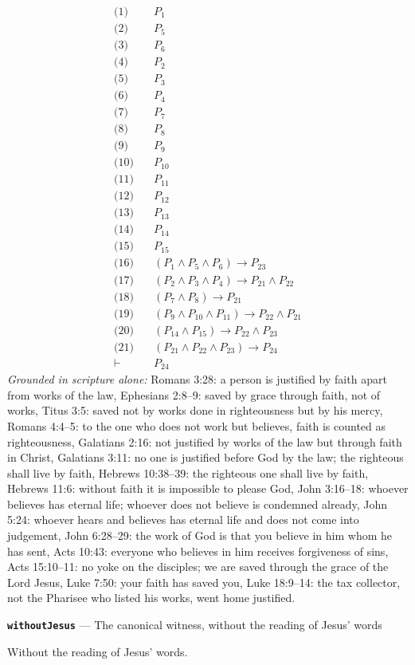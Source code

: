 \documentclass[11pt]{article}
\begin{document}
\begin{align*}
  \text{(1)} \quad & P_{1} \\
  \text{(2)} \quad & P_{5} \\
  \text{(3)} \quad & P_{6} \\
  \text{(4)} \quad & P_{2} \\
  \text{(5)} \quad & P_{3} \\
  \text{(6)} \quad & P_{4} \\
  \text{(7)} \quad & P_{7} \\
  \text{(8)} \quad & P_{8} \\
  \text{(9)} \quad & P_{9} \\
  \text{(10)} \quad & P_{10} \\
  \text{(11)} \quad & P_{11} \\
  \text{(12)} \quad & P_{12} \\
  \text{(13)} \quad & P_{13} \\
  \text{(14)} \quad & P_{14} \\
  \text{(15)} \quad & P_{15} \\
  \text{(16)} \quad & (P_{1} \land P_{5} \land P_{6}) \rightarrow P_{23} \\
  \text{(17)} \quad & (P_{2} \land P_{3} \land P_{4}) \rightarrow P_{21} \land P_{22} \\
  \text{(18)} \quad & (P_{7} \land P_{8}) \rightarrow P_{21} \\
  \text{(19)} \quad & (P_{9} \land P_{10} \land P_{11}) \rightarrow P_{22} \land P_{21} \\
  \text{(20)} \quad & (P_{14} \land P_{15}) \rightarrow P_{22} \land P_{23} \\
  \text{(21)} \quad & (P_{21} \land P_{22} \land P_{23}) \rightarrow P_{24} \\
  \vdash \quad & P_{24}
\end{align*}
\emph{Grounded in scripture alone:} Romans 3:28: a person is justified by faith apart from works of the law, Ephesians 2:8–9: saved by grace through faith, not of works, Titus 3:5: saved not by works done in righteousness but by his mercy, Romans 4:4–5: to the one who does not work but believes, faith is counted as righteousness, Galatians 2:16: not justified by works of the law but through faith in Christ, Galatians 3:11: no one is justified before God by the law; the righteous shall live by faith, Hebrews 10:38–39: the righteous one shall live by faith, Hebrews 11:6: without faith it is impossible to please God, John 3:16–18: whoever believes has eternal life; whoever does not believe is condemned already, John 5:24: whoever hears and believes has eternal life and does not come into judgement, John 6:28–29: the work of God is that you believe in him whom he has sent, Acts 10:43: everyone who believes in him receives forgiveness of sins, Acts 15:10–11: no yoke on the disciples; we are saved through the grace of the Lord Jesus, Luke 7:50: your faith has saved you, Luke 18:9–14: the tax collector, not the Pharisee who listed his works, went home justified.
\par\medskip\noindent\textbf{\texttt{without\allowbreak{}Jesus}} --- The canonical witness, without the reading of Jesus' words\par\nobreak\noindent
Without the reading of Jesus' words.
\end{document}
